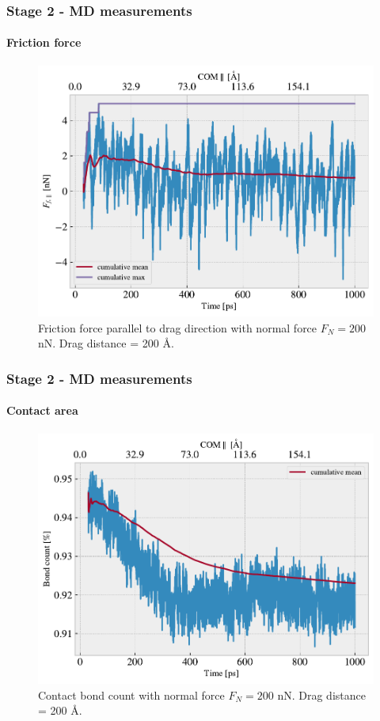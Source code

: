 \documentclass[
	10pt, %
]{beamer}
\begin{document}
\begin{frame}
	\frametitle{Stage 2 - MD measurements}
	\framesubtitle{Friction force}

	
	\begin{figure}
		\includegraphics[width=0.7\linewidth]{figures/drag2.pdf}
		\caption{Friction force parallel to drag direction with normal force $F_N = 200$ nN. Drag distance = 200 Å.}
	\end{figure}	
	
\end{frame}



\begin{frame}
	\frametitle{Stage 2 - MD measurements}
	\framesubtitle{Contact area}

	
	\begin{figure}
		\includegraphics[width=0.7\linewidth]{figures/contact1.pdf}
		\caption{Contact bond count with normal force $F_N = 200$ nN. Drag distance = 200 Å.}
	\end{figure}	
	
\end{frame}
\end{document}
